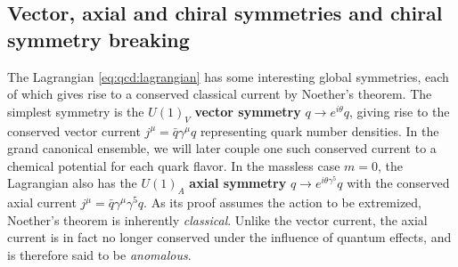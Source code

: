 \subsection*{Vector, axial and chiral symmetries and chiral symmetry breaking}

The Lagrangian \eqref{eq:qcd:lagrangian} has some interesting global symmetries, each of which gives rise to a conserved classical current by Noether's theorem.
The simplest symmetry is the $U(1)_V$ \textbf{vector symmetry} $q \rightarrow e^{i \theta} q$, giving rise to the conserved vector current $j^\mu = \bar{q} \gamma^\mu q$ representing quark number densities.
In the grand canonical ensemble, we will later couple one such conserved current to a chemical potential for each quark flavor.
In the massless case $m = 0$, the Lagrangian also has the $U(1)_A$ \textbf{axial symmetry} $q \rightarrow e^{i \theta \gamma^5} q$ with the conserved axial current $j^\mu = \bar{q} \gamma^\mu \gamma^5 q$.
As its proof assumes the action to be extremized, Noether's theorem is inherently \emph{classical}.
Unlike the vector current, the axial current is in fact no longer conserved under the influence of quantum effects, and is therefore said to be \emph{anomalous}.

